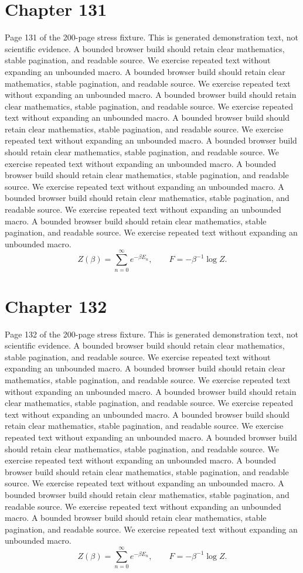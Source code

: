\documentclass[11pt]{article}
\begin{document}
\section*{Chapter 131}
Page 131 of the 200-page stress fixture. This is generated demonstration text, not scientific evidence.
A bounded browser build should retain clear mathematics, stable pagination, and readable source. We exercise repeated text without expanding an unbounded macro.
A bounded browser build should retain clear mathematics, stable pagination, and readable source. We exercise repeated text without expanding an unbounded macro.
A bounded browser build should retain clear mathematics, stable pagination, and readable source. We exercise repeated text without expanding an unbounded macro.
A bounded browser build should retain clear mathematics, stable pagination, and readable source. We exercise repeated text without expanding an unbounded macro.
A bounded browser build should retain clear mathematics, stable pagination, and readable source. We exercise repeated text without expanding an unbounded macro.
A bounded browser build should retain clear mathematics, stable pagination, and readable source. We exercise repeated text without expanding an unbounded macro.
A bounded browser build should retain clear mathematics, stable pagination, and readable source. We exercise repeated text without expanding an unbounded macro.
A bounded browser build should retain clear mathematics, stable pagination, and readable source. We exercise repeated text without expanding an unbounded macro.
\[Z(\beta)=\sum_{n=0}^{\infty}e^{-\beta E_n},\qquad F=-\beta^{-1}\log Z.\]
\newpage
\section*{Chapter 132}
Page 132 of the 200-page stress fixture. This is generated demonstration text, not scientific evidence.
A bounded browser build should retain clear mathematics, stable pagination, and readable source. We exercise repeated text without expanding an unbounded macro.
A bounded browser build should retain clear mathematics, stable pagination, and readable source. We exercise repeated text without expanding an unbounded macro.
A bounded browser build should retain clear mathematics, stable pagination, and readable source. We exercise repeated text without expanding an unbounded macro.
A bounded browser build should retain clear mathematics, stable pagination, and readable source. We exercise repeated text without expanding an unbounded macro.
A bounded browser build should retain clear mathematics, stable pagination, and readable source. We exercise repeated text without expanding an unbounded macro.
A bounded browser build should retain clear mathematics, stable pagination, and readable source. We exercise repeated text without expanding an unbounded macro.
A bounded browser build should retain clear mathematics, stable pagination, and readable source. We exercise repeated text without expanding an unbounded macro.
A bounded browser build should retain clear mathematics, stable pagination, and readable source. We exercise repeated text without expanding an unbounded macro.
\[Z(\beta)=\sum_{n=0}^{\infty}e^{-\beta E_n},\qquad F=-\beta^{-1}\log Z.\]
\newpage
\end{document}
